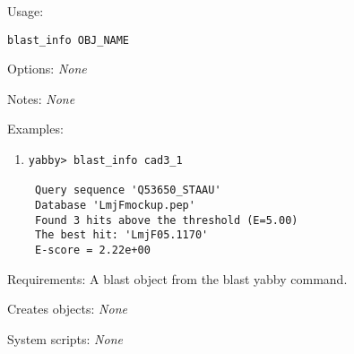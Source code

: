\begin{description}


\item{Usage:}

{\tt blast\_info OBJ\_NAME}



\item{Options:} {\em None}


\item{Notes:} {\em None}


\item{Examples:}
\begin{enumerate}

\item
\begin{verbatim}
yabby> blast_info cad3_1

 Query sequence 'Q53650_STAAU'
 Database 'LmjFmockup.pep'
 Found 3 hits above the threshold (E=5.00)
 The best hit: 'LmjF05.1170'
 E-score = 2.22e+00

\end{verbatim}

\end{enumerate}


\item{Requirements:} A blast object from the blast yabby command.


\item{Creates objects:} {\em None}


\item{System scripts:} {\em None}

\end{description}



\subsection[blastg]{  }



